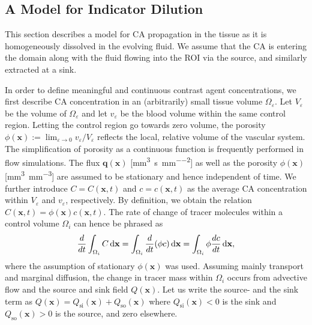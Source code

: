 \documentclass[journal,twocolumn]{IEEEtran}
\newcommand{\Qso}{Q_{\mathrm{so}}}
\newcommand{\Qsi}{Q_{\mathrm{si}}}
\newcommand{\vq}{\mathbf{q}}
\newcommand{\vx}{\mathbf{x}}
\newcommand{\siq}{\milli\meter\cubed\per\second\per\milli\meter\squared}
\newcommand{\siphi}{\milli\meter\cubed\per\milli\meter\cubed}
\begin{document}
	\subsection{A Model for Indicator Dilution}\label{sec:transport}

	This section describes a model for  CA propagation in the tissue as it is homogeneously dissolved in the evolving fluid.
	We assume that the CA is entering the domain along with the fluid flowing into the ROI via the source, and similarly extracted at a sink.

	In order to define meaningful and continuous contrast agent concentrations, we first describe CA concentration in an (arbitrarily) small tissue volume $\Omega_\varepsilon$.
	Let $V_\varepsilon$ be the volume of $\Omega_\varepsilon$ and let $v_\varepsilon$ be the blood volume within the same control region.
	Letting the control region go towards zero volume, the porosity $\phi(\vx) :=  \lim_{\varepsilon \to 0} v_\varepsilon/V_\varepsilon$ reflects the local, relative volume of the vascular system. The simplification of porosity as a continuous function is frequently performed in flow simulations.
	The flux $\vq(\vx)$ [\si{\siq}] as well as the porosity $\phi(\vx)$ [\si{\siphi}] are assumed to be stationary and hence independent of time.	
	We further introduce $C = C(\vx,t)$ and $c = c(\vx,t)$ as the average CA concentration within $V_\varepsilon$ and $v_\varepsilon$, respectively.
	By definition, we obtain the relation $C(\vx,t) = \phi(\vx)  c(\vx,t)$.
	The rate of change of tracer molecules within a control volume $\Omega_i$ can hence be phrased as
	\begin{equation}
		\frac{d}{dt} \int_{\Omega_i}C  \diffint \vx = \int_{\Omega_i}	\frac{d}{dt} (\phi c) \diffint \vx = \int_{\Omega_i} \phi \frac{d c}{dt} \diffint \vx,
		\label{eq:dmdt}
	\end{equation}	
	where the assumption of stationary $\phi(\vx)$ was used.
	Assuming mainly transport and marginal diffusion, the change in tracer mass within $\Omega_i$ occurs from advective flow and the source and sink field $Q(\vx)$.
	Let us write the source- and the sink term as $Q(\vx) = \Qsi(\vx) + \Qso(\vx)$ where $\Qsi(\vx) < 0$ is the sink and $\Qso(\vx) > 0$ is the source, and zero elsewhere. 
\end{document}
